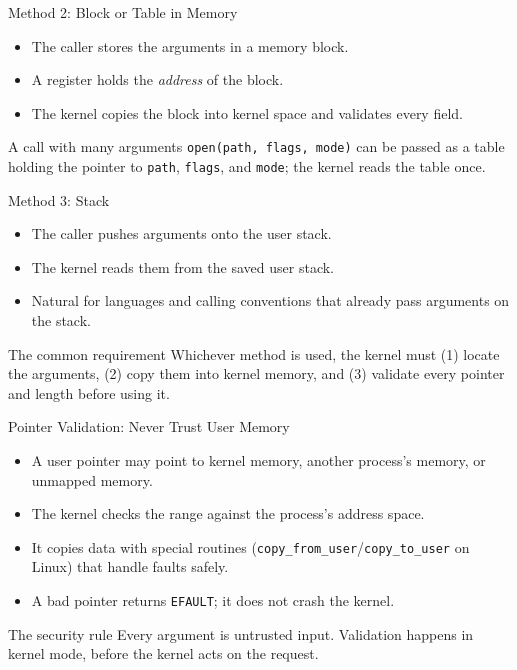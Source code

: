 \documentclass[aspectratio=169]{beamer}
\begin{document}
\begin{frame}{Method 2: Block or Table in Memory}
  \begin{itemize}
    \item The caller stores the arguments in a memory block.
    \item A register holds the \emph{address} of the block.
    \item The kernel copies the block into kernel space and validates every
      field.
  \end{itemize}
  \vspace{0.2cm}
  \begin{exampleblock}{A call with many arguments}
    \texttt{open(path, flags, mode)} can be passed as a table holding the
    pointer to \texttt{path}, \texttt{flags}, and \texttt{mode}; the kernel
    reads the table once.
  \end{exampleblock}
\end{frame}

\begin{frame}{Method 3: Stack}
  \begin{itemize}
    \item The caller pushes arguments onto the user stack.
    \item The kernel reads them from the saved user stack.
    \item Natural for languages and calling conventions that already pass
      arguments on the stack.
  \end{itemize}
  \vspace{0.2cm}
  \begin{block}{The common requirement}
    Whichever method is used, the kernel must (1) locate the arguments,
    (2) copy them into kernel memory, and (3) validate every pointer and
    length before using it.
  \end{block}
\end{frame}

\begin{frame}{Pointer Validation: Never Trust User Memory}
  \begin{itemize}
    \item A user pointer may point to kernel memory, another process's memory,
      or unmapped memory.
    \item The kernel checks the range against the process's address space.
    \item It copies data with special routines
      (\texttt{copy\_from\_user}/\texttt{copy\_to\_user} on Linux) that handle
      faults safely.
    \item A bad pointer returns \texttt{EFAULT}; it does not crash the kernel.
  \end{itemize}
  \vspace{0.2cm}
  \begin{alertblock}{The security rule}
    Every argument is untrusted input. Validation happens in kernel mode,
    before the kernel acts on the request.
  \end{alertblock}
\end{frame}
\end{document}
